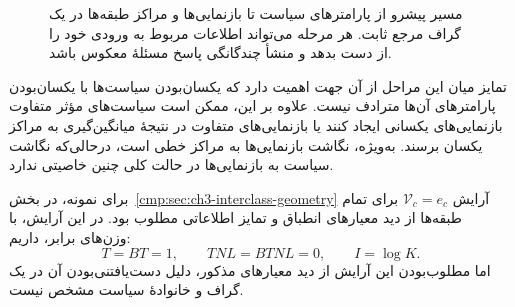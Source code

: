 \begin{figure}[!htbp]
\centering
\begin{LTR}
\centering
{}
\end{LTR}
\caption{مسیر پیشرو از پارامترهای سیاست تا
بازنمایی‌ها و مراکز طبقه‌ها در یک گراف مرجع
ثابت. هر مرحله می‌تواند اطلاعات مربوط به
ورودی خود را از دست بدهد و منشأ چندگانگی
پاسخ مسئلهٔ معکوس باشد.}
\label{cmp:fig:ch3-policy-forward-chain}
\end{figure}

تمایز میان این مراحل از آن جهت اهمیت دارد
که یکسان‌بودن سیاست‌ها با یکسان‌بودن
پارامترهای آن‌ها مترادف نیست. علاوه بر این،
ممکن است سیاست‌های مؤثر متفاوت بازنمایی‌های
یکسانی ایجاد کنند یا بازنمایی‌های متفاوت در
نتیجهٔ میانگین‌گیری به مراکز یکسان برسند.
به‌ویژه، نگاشت بازنمایی‌ها به مراکز خطی است،
درحالی‌که نگاشت سیاست به بازنمایی‌ها در حالت
کلی چنین خاصیتی ندارد.

برای نمونه، در بخش~\ref{cmp:sec:ch3-interclass-geometry}
آرایش $\mathcal V_c=e_c$ برای تمام طبقه‌ها
از دید معیارهای انطباق و تمایز اطلاعاتی
مطلوب بود. در این آرایش، با وزن‌های برابر،
داریم:
\[
T=BT=1,\qquad TNL=BTNL=0,\qquad I=\log K.
\]
اما مطلوب‌بودن این آرایش از دید معیارهای
مذکور، دلیل دست‌یافتنی‌بودن آن در یک گراف
و خانوادهٔ سیاست مشخص نیست.


